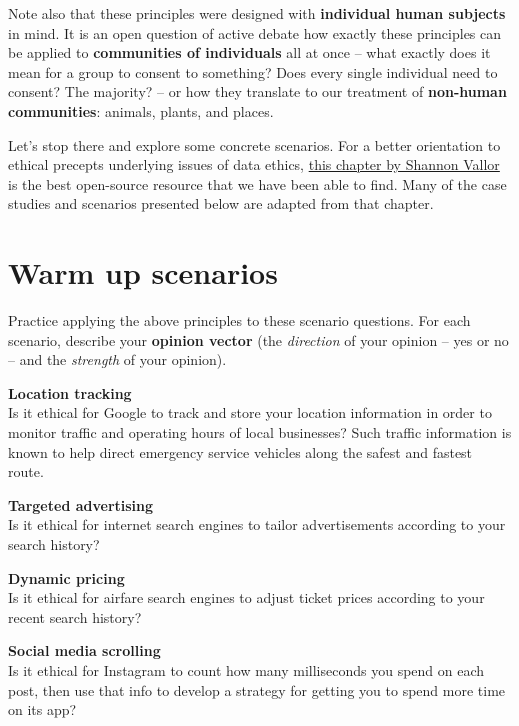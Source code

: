 \documentclass[
]{book}
\begin{document}
Note also that these principles were designed with \textbf{individual human subjects} in mind. It is an open question of active debate how exactly these principles can be applied to \textbf{communities of individuals} all at once -- what exactly does it mean for a group to consent to something? Does every single individual need to consent? The majority? -- or how they translate to our treatment of \textbf{non-human communities}: animals, plants, and places.

Let's stop there and explore some concrete scenarios. For a better orientation to ethical precepts underlying issues of data ethics, \href{https://www.scu.edu/media/ethics-center/technology-ethics/IntroToDataEthics.pdf}{this chapter by Shannon Vallor} is the best open-source resource that we have been able to find. Many of the case studies and scenarios presented below are adapted from that chapter.

\hypertarget{warm-up-scenarios}{%
\section*{Warm up scenarios}\label{warm-up-scenarios}}

Practice applying the above principles to these scenario questions. For each scenario, describe your \textbf{opinion vector} (the \emph{direction} of your opinion -- yes or no -- and the \emph{strength} of your opinion).

\textbf{Location tracking}\\
Is it ethical for Google to track and store your location information in order to monitor traffic and operating hours of local businesses? Such traffic information is known to help direct emergency service vehicles along the safest and fastest route.

\textbf{Targeted advertising}\\
Is it ethical for internet search engines to tailor advertisements according to your search history?

\textbf{Dynamic pricing}\\
Is it ethical for airfare search engines to adjust ticket prices according to your recent search history?

\textbf{Social media scrolling}\\
Is it ethical for Instagram to count how many milliseconds you spend on each post, then use that info to develop a strategy for getting you to spend more time on its app?
\end{document}
